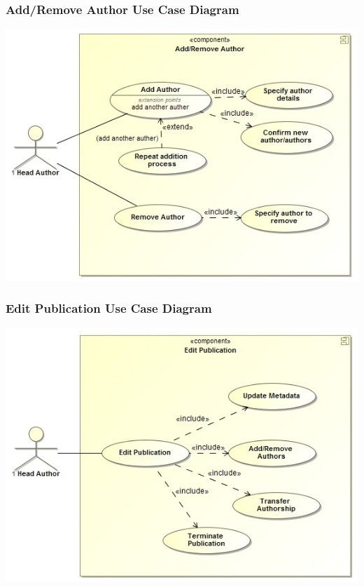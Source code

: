 \documentclass[a4paper,12pt]{article}
\begin{document}
	\subsubsection{Add/Remove Author Use Case Diagram}
	\includegraphics[width=1\textwidth]{./AddRemoveAuthor.jpg}\\[1.5cm]

	\subsubsection{Edit Publication Use Case Diagram}
	\includegraphics[width=1\textwidth]{./EditPublication.jpg}\\[1.5cm]
\end{document}

